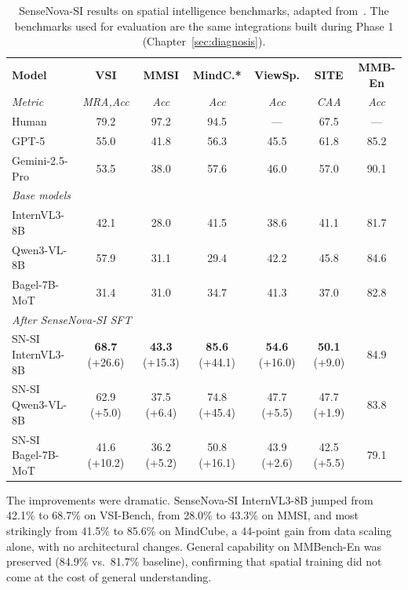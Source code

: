 \begin{table}[htbp]
\centering
\caption{SenseNova-SI results on spatial intelligence benchmarks, adapted from~\cite{cai2025scalingspatialintelligencemultimodal}. The benchmarks used for evaluation are the same integrations built during Phase 1 (Chapter~\ref{sec:diagnosis}).}
\label{tab:scaling_results}
\renewcommand{\arraystretch}{1.1}
\footnotesize
\setlength{\tabcolsep}{4pt}
\begin{tabular}{lcccccc}
\toprule
\textbf{Model} & \textbf{VSI} & \textbf{MMSI} & \textbf{MindC.*} & \textbf{ViewSp.} & \textbf{SITE} & \textbf{MMB-En} \\
\textit{Metric} & \textit{MRA,Acc} & \textit{Acc} & \textit{Acc} & \textit{Acc} & \textit{CAA} & \textit{Acc} \\
\midrule
Human & 79.2 & 97.2 & 94.5 & --- & 67.5 & --- \\
GPT-5 & 55.0 & 41.8 & 56.3 & 45.5 & 61.8 & 85.2 \\
Gemini-2.5-Pro & 53.5 & 38.0 & 57.6 & 46.0 & 57.0 & 90.1 \\
\midrule
\multicolumn{7}{l}{\textit{Base models}} \\
InternVL3-8B & 42.1 & 28.0 & 41.5 & 38.6 & 41.1 & 81.7 \\
Qwen3-VL-8B & 57.9 & 31.1 & 29.4 & 42.2 & 45.8 & 84.6 \\
Bagel-7B-MoT & 31.4 & 31.0 & 34.7 & 41.3 & 37.0 & 82.8 \\
\midrule
\multicolumn{7}{l}{\textit{After SenseNova-SI SFT}} \\
SN-SI InternVL3-8B & \textbf{68.7} (+26.6) & \textbf{43.3} (+15.3) & \textbf{85.6} (+44.1) & \textbf{54.6} (+16.0) & \textbf{50.1} (+9.0) & 84.9 \\
SN-SI Qwen3-VL-8B & 62.9 (+5.0) & 37.5 (+6.4) & 74.8 (+45.4) & 47.7 (+5.5) & 47.7 (+1.9) & 83.8 \\
SN-SI Bagel-7B-MoT & 41.6 (+10.2) & 36.2 (+5.2) & 50.8 (+16.1) & 43.9 (+2.6) & 42.5 (+5.5) & 79.1 \\
\bottomrule
\end{tabular}
\end{table}

The improvements were dramatic. SenseNova-SI InternVL3-8B jumped from 42.1\% to 68.7\% on VSI-Bench, from 28.0\% to 43.3\% on MMSI, and most strikingly from 41.5\% to 85.6\% on MindCube, a 44-point gain from data scaling alone, with no architectural changes. General capability on MMBench-En was preserved (84.9\% vs.\ 81.7\% baseline), confirming that spatial training did not come at the cost of general understanding.

